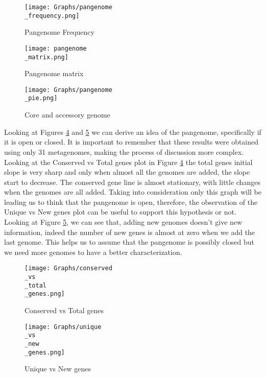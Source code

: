 \documentclass[a4paper,titlepage, oneside]{book}
\begin{document}
\begin{figure}[ht]
\centering
\texttt{[image: Graphs/pangenome\\\_frequency.png]}
\caption{Pangenome Frequency}
\label{fig:pangenome2}
\end{figure}

\begin{figure}[ht]
\centering
\texttt{[image: pangenome\\\_matrix.png]}
\caption{Pangenome matrix}
\label{fig:pangenome1}
\end{figure}

\begin{figure}[ht]
\centering
\texttt{[image: Graphs/pangenome\\\_pie.png]}
\caption{Core and accessory genome}
\label{fig:pangenome5}
\end{figure}


Looking at Figures \ref{fig:pangenome3} and  \ref{fig:pangenome4} we can derive an idea of the pangenome, specifically if it is open or closed. It is important to remember that these results were obtained using only 31 metagenomes, making the process of discussion more complex. Looking at the Conserved vs Total genes plot in Figure \ref{fig:pangenome3} the total genes initial slope is very sharp and only when almost all the genomes are added, the slope start to decrease. The conserved gene line is almost stationary, with little changes when the genomes are all added. Taking into consideration only this graph will be leading us to think that the pangenome is open, therefore, the observation of the Unique vs New genes plot can be useful to support this hypothesis or not. Looking at Figure \ref{fig:pangenome4}, we can see that, adding new genomes doesn't give new information, indeed the number of new genes is almost at zero when we add the last genome. This helps us to assume that the pangenome is possibly closed but we need more genomes to have a better characterization.


\begin{figure}[ht]
\centering
\texttt{[image: Graphs/conserved\\\_vs\\\_total\\\_genes.png]}
\caption{Conserved vs Total genes}
\label{fig:pangenome3}
\end{figure}

\begin{figure}[ht]
\centering
\texttt{[image: Graphs/unique\\\_vs\\\_new\\\_genes.png]}
\caption{Unique vs New genes}
\label{fig:pangenome4}
\end{figure}
\end{document}
